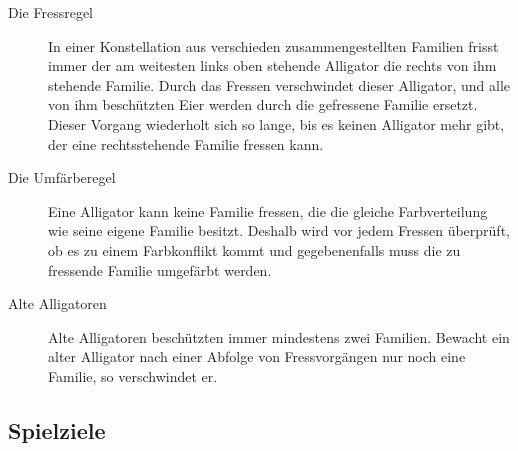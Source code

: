 	\begin{description}

		\item[Die Fressregel] In einer Konstellation aus verschieden zusammengestellten Familien frisst immer der am weitesten links oben stehende Alligator die rechts von ihm stehende Familie.
		Durch das Fressen verschwindet dieser Alligator, und alle von ihm beschützten Eier werden durch die gefressene Familie ersetzt.
		Dieser Vorgang wiederholt sich so lange, bis es keinen Alligator mehr gibt, der eine rechtsstehende Familie fressen kann.

		\item[Die Umfärberegel] Eine Alligator kann keine Familie fressen, die die gleiche Farbverteilung wie seine eigene Familie besitzt.
		Deshalb wird vor jedem Fressen überprüft, ob es zu einem Farbkonflikt kommt und gegebenenfalls muss die zu fressende Familie umgefärbt werden.

		\item[Alte Alligatoren] Alte Alligatoren beschützten immer mindestens zwei Familien.
		Bewacht ein alter Alligator nach einer Abfolge von Fressvorgängen nur noch eine Familie, so verschwindet er.

	\end{description}

\subsection{Spielziele}

